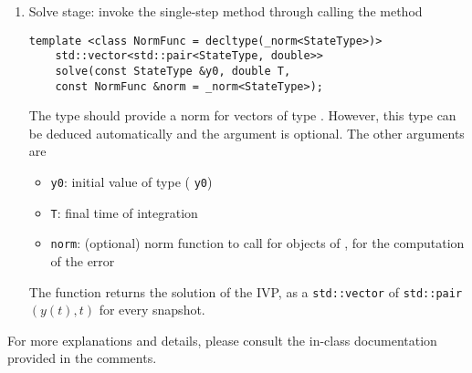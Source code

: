 \begin{enumerate}
\item Solve stage: invoke the single-step method through calling the method
  \begin{lstlisting}[emph={solve},style=cppsimple]
    template <class NormFunc = decltype(_norm<StateType>)>
    std::vector<std::pair<StateType, double>>
    solve(const StateType &y0, double T,
    const NormFunc &norm = _norm<StateType>);
  \end{lstlisting}
  The type  should provide a norm for vectors of type .
  However, this type can be deduced automatically and the argument  is optional.
  The other arguments are 
  \begin{itemize}
  \item \texttt{y0}: initial value of type  (
    \texttt{y0})
  \item \texttt{T}:
    final time of integration
  \item \texttt{norm}: (optional) norm function to call for objects of
    , for the computation of the error
  \end{itemize}

  The function returns the solution of the IVP, as a \texttt{std::vector} 
  of \texttt{std::pair} $(y(t), t)$ for every snapshot.
\end{enumerate}

For more explanations and details, please consult the in-class documentation provided in
the comments.
